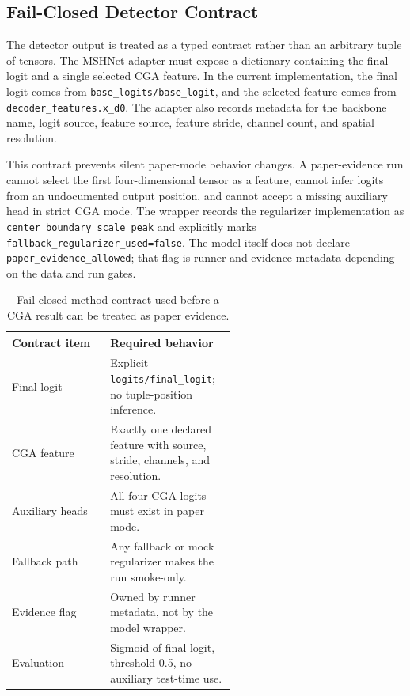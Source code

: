 \documentclass[letterpaper]{article}
\begin{document}
\subsection{Fail-Closed Detector Contract}

The detector output is treated as a typed contract rather than an arbitrary tuple of tensors. The MSHNet adapter must expose a dictionary containing the final logit and a single selected CGA feature. In the current implementation, the final logit comes from \texttt{base\_logits/base\_logit}, and the selected feature comes from \texttt{decoder\_features.x\_d0}. The adapter also records metadata for the backbone name, logit source, feature source, feature stride, channel count, and spatial resolution.

This contract prevents silent paper-mode behavior changes. A paper-evidence run cannot select the first four-dimensional tensor as a feature, cannot infer logits from an undocumented output position, and cannot accept a missing auxiliary head in strict CGA mode. The wrapper records the regularizer implementation as \texttt{center\_boundary\_scale\_peak} and explicitly marks \texttt{fallback\_regularizer\_used=false}. The model itself does not declare \texttt{paper\_evidence\_allowed}; that flag is runner and evidence metadata depending on the data and run gates.

\begin{table}[t]
\centering
\caption{Fail-closed method contract used before a CGA result can be treated as paper evidence.}
\label{tab:contract}
\small
\begin{tabular}{lp{0.56\linewidth}}
\toprule
Contract item & Required behavior \\
\midrule
Final logit & Explicit \texttt{logits/final\_logit}; no tuple-position inference. \\
CGA feature & Exactly one declared feature with source, stride, channels, and resolution. \\
Auxiliary heads & All four CGA logits must exist in paper mode. \\
Fallback path & Any fallback or mock regularizer makes the run smoke-only. \\
Evidence flag & Owned by runner metadata, not by the model wrapper. \\
Evaluation & Sigmoid of final logit, threshold 0.5, no auxiliary test-time use. \\
\bottomrule
\end{tabular}
\end{table}
\end{document}
